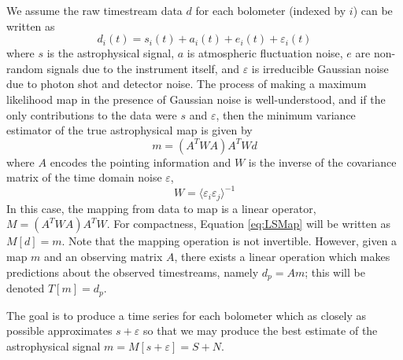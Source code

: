 \documentclass[12pt,preprint]{aastex}
\newcommand{\epsi}{\varepsilon}
\begin{document}
We assume the raw timestream data $d$ for each bolometer (indexed by
$i$) can be written as
\begin{equation}
d_i(t) = s_i(t)+a_i(t)+e_i(t)+\epsi_i(t)
\end{equation}
where $s$ is the astrophysical signal, $a$ is atmospheric fluctuation
noise, $e$ are non-random signals due to the instrument itself, and
$\epsi$ is irreducible Gaussian noise due to photon shot and detector
noise.  The process of making a maximum likelihood map in the presence
of Gaussian noise is well-understood, and if the only contributions to
the data were $s$ and $\epsi$, then the minimum variance estimator of
the true astrophysical map is given by
\begin{equation}
\label{eq:LSMap}
m = (A^T W A) A^T W d
\end{equation}
where $A$ encodes the pointing information and $W$ is the inverse of
the covariance matrix of the time domain noise $\epsi$,
\begin{equation}
W = {\langle \epsi_i \epsi_j \rangle}^{-1}
\end{equation}
In this case, the mapping from data to map is a linear operator, $M
=(A^T W A) A^T W$.  For compactness, Equation \ref{eq:LSMap} will be
written as $M[d] = m$.  Note that the mapping operation is not
invertible.  However, given a map $m$ and an observing matrix $A$,
there exists a linear operation which makes predictions about the
observed timestreams, namely $d_p = A m$; this will be denoted $T[m] =
d_p$.

The goal is to produce a time series for each bolometer which as
closely as possible approximates $s + \epsi$ so that we may produce
the best estimate of the astrophysical signal $m = M[s+\epsi] = S + N$.
\end{document}
